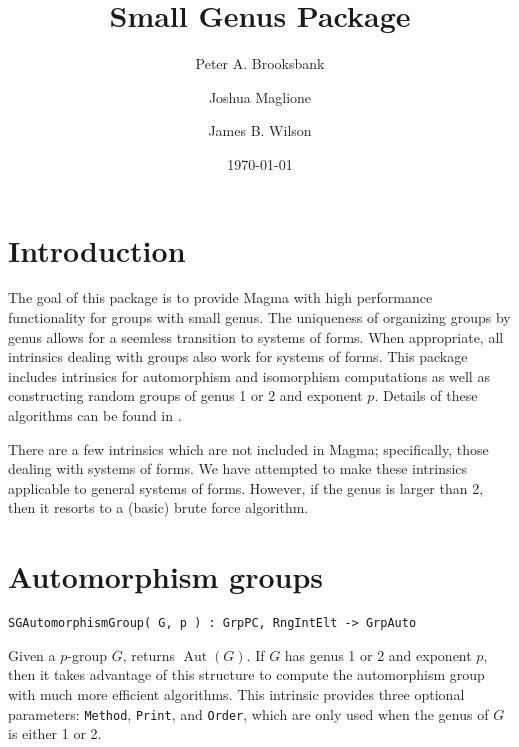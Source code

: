 \documentclass{documentation}
\title{Small Genus Package}
\author{Peter A. Brooksbank}
\author{Joshua Maglione}
\author{James B. Wilson}
\date{\today}
\DeclareMathOperator{\Aut}{Aut}
\begin{document}
\frontmatter

\maketitle
\tableofcontents

\mainmatter

\chapter{Introduction}

The goal of this package is to provide {\sc Magma} \cite{Magma} with high performance functionality for groups with small genus. 
The uniqueness of organizing groups by genus allows for a seemless transition to systems of forms.
When appropriate, all intrinsics dealing with groups also work for systems of forms. 
This package includes intrinsics for automorphism and isomorphism computations as well as constructing random groups of genus 1 or 2 and exponent $p$.
Details of these algorithms can be found in \cite{BMW}.

There are a few intrinsics which are not included in {\sc Magma}; specifically, those dealing with systems of forms. 
We have attempted to make these intrinsics applicable to general systems of forms. However, if the genus is larger than 2, then it resorts to a (basic) brute force algorithm. 

\chapter{Automorphism groups}

\color{blue}
\begin{verbatim}
SGAutomorphismGroup( G, p ) : GrpPC, RngIntElt -> GrpAuto
\end{verbatim}

\color{black}
Given a $p$-group $G$, returns $\Aut(G)$.
If $G$ has genus 1 or 2 and exponent $p$, then it takes advantage of this structure 
to compute the automorphism group with much more efficient algorithms.
This intrinsic provides three optional parameters: {\tt Method}, {\tt Print}, and {\tt Order}, 
which are only used when the genus of $G$ is either 1 or 2.
\end{document}
